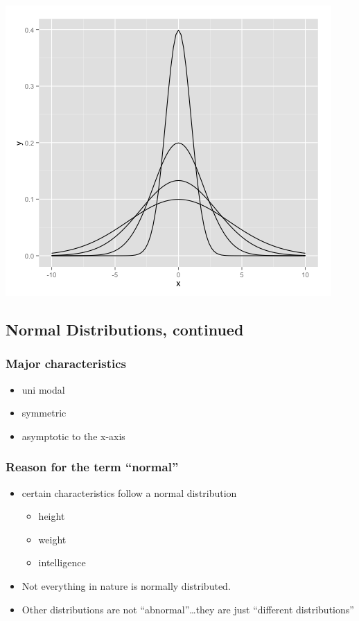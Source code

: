 \documentclass[]{article}
\begin{document}
\includegraphics{normal.png}

\subsection{Normal Distributions,
continued}\label{normal-distributions-continued}

\subsubsection{Major characteristics}\label{major-characteristics}

\begin{itemize}
\itemsep1pt\parskip0pt
\item
  uni modal
\item
  symmetric
\item
  asymptotic to the x-axis
\end{itemize}

\subsubsection{Reason for the term
``normal''}\label{reason-for-the-term-normal}

\begin{itemize}
\itemsep1pt\parskip0pt
\item
  certain characteristics follow a normal distribution

  \begin{itemize}
  \itemsep1pt\parskip0pt
  \item
    height
  \item
    weight
  \item
    intelligence
  \end{itemize}
\item
  Not everything in nature is normally distributed.
\item
  Other distributions are not ``abnormal''\ldots{}they are just
  ``different distributions''
\end{itemize}
\end{document}
